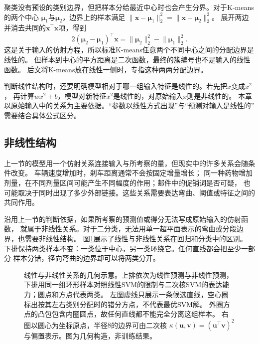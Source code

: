 聚类没有预设的类别边界，但把样本分给最近中心时也会产生分界。对于K-means的两个中心
$\bm{\mu}_1$与$\bm{\mu}_2$，边界上的样本满足
$\lVert\bm{x}-\bm{\mu}_1\rVert_2^2=\lVert\bm{x}-\bm{\mu}_2\rVert_2^2$。
展开两边并消去共同的$\bm{x}^{\top}\bm{x}$项，得到
\begin{equation}
  2(\bm{\mu}_2-\bm{\mu}_1)^{\top}\bm{x}
  =\lVert\bm{\mu}_2\rVert_2^2-\lVert\bm{\mu}_1\rVert_2^2.
  \label{eq:models-kmeans-boundary}
\end{equation}
这是关于输入的仿射方程，所以标准K-means任意两个不同中心之间的分配边界是线性的。
但样本到中心的平方距离是二次函数，最终的簇编号也不是输入的线性函数。
后文将K-means放在线性一侧时，专指这种两两分配边界。

判断线性结构时，还要明确模型相对于哪一组输入特征是线性的。若先把$x$变成$x^2$，
再计算$wx^2+b$，模型对新特征$x^2$是线性的，对原始输入$x$则是非线性的。
本章以原始输入中的关系为主要依据。“参数以线性方式出现”与“预测对输入是线性的”
需要结合具体公式区分。

\subsection{非线性结构}
\label{sec:models-nonlinear}

上一节的模型用一个仿射关系连接输入与所考察的量，但现实中的许多关系会随条件改变。
车辆速度增加时，刹车距离通常不会按固定增量增长；
同一种药物增加剂量，在不同剂量区间可能产生不同幅度的作用；邮件中的促销词是否可疑，
也可能取决于同时出现了多少外部链接。这些关系需要表达弯曲、阈值或特征之间的共同作用。

沿用上一节的判断依据，如果所考察的预测值或得分无法写成原始输入的仿射函数，
就属于非线性关系。对于二分类，无法用单一超平面表示的弯曲或分段边界，也需要非线性结构。
图\ref{fig:models-linear-nonlinear}展示了线性与非线性关系在回归和分类中的区别。
下排保持两类样本不变：一类位于中心，另一类环绕它。任何直线都会把至少一部分
样本分错，径向弯曲的边界却可以将两类分开。

\begin{figure}[!ht]
  \centering
  
  \caption{线性与非线性关系的几何示意。上排依次为线性预测与非线性预测，
  下排用同一组环形样本对照线性SVM的限制与二次核SVM的表达能力；圆点和方点代表两类。
  左图虚线只展示一条候选直线，空心圈标出按其左右类别分配时的错分方点，不代表最优SVM解。
  外圈方点的凸包包含内圈圆点，故任何直线都不能完全分离这组样本。
  右图以圆心为坐标原点，半径$8$的边界可由二次核
  $\kappa(\bm u,\bm v)=(\bm u^{\top}\bm v)^2$与偏置表示。图为几何构造，非训练结果。}
  \label{fig:models-linear-nonlinear}
\end{figure}

